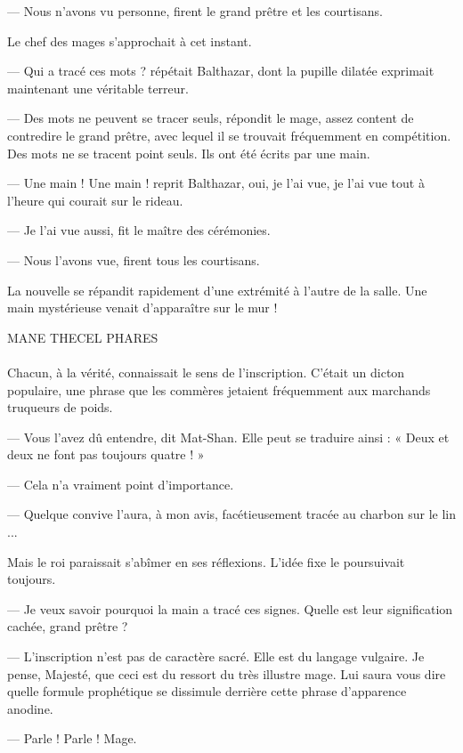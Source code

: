 \documentclass[a4paper, 11pt, oneside, polutonikogreek, french]{article}
\begin{document}
--- Nous n'avons vu personne, firent le grand prêtre et les courtisans.

Le chef des mages s'approchait à cet instant.

--- Qui a tracé ces mots ? répétait Balthazar, dont la pupille dilatée exprimait maintenant une véritable terreur.

--- Des mots ne peuvent se tracer seuls, répondit le mage, assez content de contredire le grand prêtre, avec lequel il se trouvait fréquemment en compétition. Des mots ne se tracent point seuls. Ils ont été écrits par une main.

--- Une main ! Une main ! reprit Balthazar, oui, je l'ai vue, je l'ai vue tout à l'heure qui courait sur le rideau.

--- Je l'ai vue aussi, fit le maître des cérémonies.

--- Nous l'avons vue, firent tous les courtisans.

La nouvelle se répandit rapidement d'une extrémité à l'autre de la salle. Une main mystérieuse venait d'apparaître sur le mur !

\begin{center}
MANE THECEL PHARES
\end{center}
\paragraph{}
Chacun, à la vérité, connaissait le sens de l'inscription. C'était un dicton populaire, une phrase que les commères jetaient fréquemment aux marchands truqueurs de poids.

--- Vous l'avez dû entendre, dit Mat-Shan. Elle peut se traduire ainsi : « Deux et deux ne font pas toujours quatre ! »

--- Cela n'a vraiment point d'importance.

--- Quelque convive l'aura, à mon avis, facétieusement tracée au charbon sur le lin ...

Mais le roi paraissait s'abîmer en ses réflexions. L'idée fixe le poursuivait toujours.

--- Je veux savoir pourquoi la main a tracé ces signes. Quelle est leur signification cachée, grand prêtre ?

--- L'inscription n'est pas de caractère sacré. Elle est du langage vulgaire. Je pense, Majesté, que ceci est du ressort du très illustre mage. Lui saura vous dire quelle formule prophétique se dissimule derrière cette phrase d'apparence anodine.

--- Parle ! Parle ! Mage.
\end{document}
